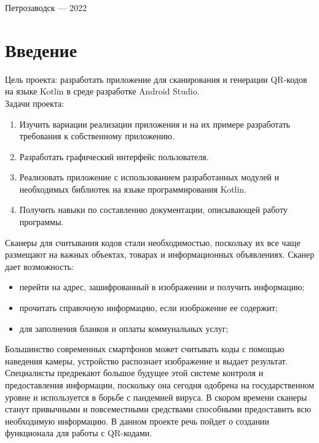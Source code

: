 \documentclass[a4paper,12pt]{article}
\begin{document}
\vfill

\begin{center}
\large
    Петрозаводск --- 2022
\end{center}



\newpage

\hypersetup{hidelinks}
\tableofcontents

\newpage
\section*{Введение}


Цель проекта: разработать приложение для сканирования и генерации QR-кодов  на языке Kotlin в среде разработке Android Studio. \\

Задачи проекта: 
\begin{enumerate}
    \item Изучить вариации реализации приложения и на их примере разработать требования к собственному приложению.
    \item Разработать графический интерфейс пользователя.
    \item Реализовать приложение с использованием разработанных модулей и необходимых библиотек на языке программирования Kotlin.
    \item Получить навыки по составлению документации, описывающей работу программы. 
\end{enumerate}

Сканеры для считывания кодов стали необходимостью, поскольку их все чаще размещают на важных объектах, товарах и информационных объявлениях. Сканер дает возможность:
\begin{itemize}
    \item перейти на адрес, зашифрованный в изображении и получить информацию;
    \item прочитать справочную информацию, если изображение ее содержит;
    \item для заполнения бланков и оплаты коммунальных услуг;
\end{itemize}

Большинство современных смартфонов может считывать коды с помощью наведения камеры, устройство распознает изображение и выдает результат. Специалисты предрекают большое будущее этой системе контроля и предоставления информации, поскольку она сегодня одобрена на государственном уровне и используется в борьбе с пандемией вируса. В скором времени сканеры станут привычными и повсеместными средствами способными предоставить всю необходимую информацию. В данном проекте речь пойдет о создании функционала для работы с QR-кодами.
\end{document}
